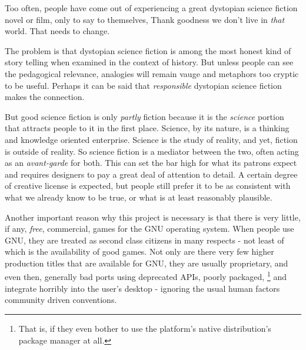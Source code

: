 

Too often, people have come out of experiencing a great dystopian science fiction novel or film, only to say to themselves, Thank goodness we don't live in {\it that} world. That needs to change.

The problem is that dystopian science fiction is among the most honest kind of story telling when examined in the context of history. But unless people can see the pedagogical relevance, analogies will remain vauge and metaphors too cryptic to be useful. Perhaps it can be said that {\it responsible} dystopian science fiction makes the connection.

But good science fiction is only {\it partly} fiction because it is the {\it science} portion that attracts people to it in the first place. Science, by its nature, is a thinking and knowledge oriented enterprise. Science is the study of reality, and yet, fiction is outside of reality. So science fiction is a mediator between the two, often acting as an {\it avant-garde} for both.
    {}
This can set the bar high for what its patrons expect and requires designers to pay a great deal of attention to detail. A certain degree of creative license is expected, but people still prefer it to be as consistent with what we already know to be true, or what is at least reasonably plausible.

Another important reason why this project is necessary is that there is very little, if any, {\it free}, commercial, games for the GNU operating system. When people use GNU, they are treated as second class citizens in many respects - not least of which is the availability of good games. Not only are there very few higher production titles that are available for GNU, they are usually proprietary, and even then, generally bad ports using deprecated APIs, poorly packaged, \footnote{That is, if they even bother to use the platform's native distribution's package manager at all.} and integrate horribly into the user's desktop - ignoring the usual human factors community driven conventions.

